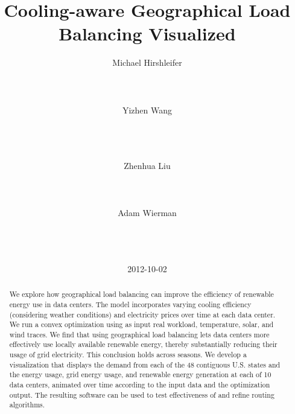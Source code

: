 \documentclass{acm_proc_article-sp}
\begin{document}
\title{Cooling-aware Geographical Load Balancing Visualized}
\author{
%
%
\alignauthor
Michael Hirshleifer\\
	\\
	\\
	\\
\alignauthor
Yizhen Wang\\
	\\
	\\
	\\
\and
\alignauthor
Zhenhua Liu\\
	\\
	\\
	\\
\alignauthor
Adam Wierman\\
	\\
	\\
	\\
}

\date{2012-10-02}

\maketitle
\begin{abstract}
We explore how geographical load balancing can improve the efficiency of renewable energy use in data centers.
The model incorporates varying cooling efficiency (considering weather conditions) and electricity prices over time at each data center.
We run a convex optimization using as input real workload, temperature, solar, and wind traces.
We find that using geographical load balancing lets data centers more effectively use locally available renewable energy, thereby substantially reducing their usage of grid electricity. This conclusion holds across seasons.
We develop a visualization that displays the demand from each of the 48 contiguous U.S. states and the energy usage, grid energy usage, and renewable energy generation at each of 10 data centers, animated over time according to the input data and the optimization output. The resulting software can be used to test effectiveness of and refine routing algorithms.
\end{abstract}
\end{document}
